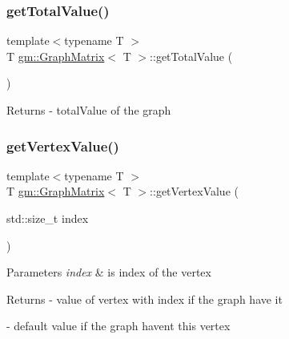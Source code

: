 \subsubsection{\texorpdfstring{get\+Total\+Value()}{getTotalValue()}}
{\footnotesize\ttfamily template$<$typename T $>$ \\
T \mbox{\hyperlink{classgm_1_1_graph_matrix}{gm\+::\+Graph\+Matrix}}$<$ T $>$\+::get\+Total\+Value (\begin{DoxyParamCaption}{ }\end{DoxyParamCaption})}

\begin{DoxyReturn}{Returns}
-\/ \textquotesingle{}total\+Value\textquotesingle{} of the graph 
\end{DoxyReturn}
\mbox{\label{classgm_1_1_graph_matrix_adacccfacb1c46e0fa0ca173846f48a11}} 
\subsubsection{\texorpdfstring{get\+Vertex\+Value()}{getVertexValue()}}
{\footnotesize\ttfamily template$<$typename T $>$ \\
T \mbox{\hyperlink{classgm_1_1_graph_matrix}{gm\+::\+Graph\+Matrix}}$<$ T $>$\+::get\+Vertex\+Value (\begin{DoxyParamCaption}\item[{std\+::size\+\_\+t}]{index }\end{DoxyParamCaption})}


\begin{DoxyParams}{Parameters}
{\em index} & is index of the vertex \\
\hline
\end{DoxyParams}
\begin{DoxyReturn}{Returns}
-\/ value of vertex with \textquotesingle{}index\textquotesingle{} if the graph have it 

-\/ default value if the graph haven\textquotesingle{}t this vertex 
\end{DoxyReturn}
\mbox{\label{classgm_1_1_graph_matrix_aaee8cb1c4d2bab6fcba5f3fc64852bfd}} 
